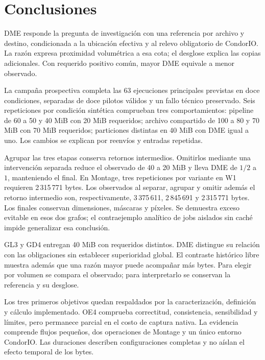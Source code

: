 \chapter{Conclusiones}
DME responde la pregunta de investigación con una referencia por archivo y destino, condicionada a la ubicación efectiva y al relevo obligatorio de CondorIO. La razón expresa proximidad volumétrica a esa cota; el desglose explica las copias adicionales. Con requerido positivo común, mayor DME equivale a menor observado.

La campaña prospectiva completa las 63 ejecuciones principales previstas en doce condiciones, separadas de doce pilotos válidos y un fallo técnico preservado. Seis repeticiones por condición sintética comprueban tres comportamientos: pipeline de 60 a 50 y 40 MiB con 20 MiB requeridos; archivo compartido de 100 a 80 y 70 MiB con 70 MiB requeridos; particiones distintas en 40 MiB con DME igual a uno. Los cambios se explican por reenvíos y entradas repetidas.

Agrupar las tres etapas conserva retornos intermedios. Omitirlos mediante una intervención separada reduce el observado de 40 a 20 MiB y lleva DME de $1/2$ a $1$, manteniendo el final. En Montage, tres repeticiones por variante en W1 requieren 2\,315\,771 bytes. Los observados al separar, agrupar y omitir además el retorno intermedio son, respectivamente, 3\,375\,611, 2\,845\,691 y 2\,315\,771 bytes. Los finales conservan dimensiones, máscaras y píxeles. Se demuestra exceso evitable en esos dos grafos; el contraejemplo analítico de jobs aislados sin caché impide generalizar esa conclusión.

GL3 y GD4 entregan 40 MiB con requeridos distintos. DME distingue su relación con las obligaciones sin establecer superioridad global. El contraste histórico libre muestra además que una razón mayor puede acompañar más bytes. Para elegir por volumen se compara el observado; para interpretarlo se conservan la referencia y su desglose.

Los tres primeros objetivos quedan respaldados por la caracterización, definición y cálculo implementado. OE4 comprueba correctitud, consistencia, sensibilidad y límites, pero permanece parcial en el costo de captura nativa. La evidencia comprende flujos pequeños, dos operaciones de Montage y un único entorno CondorIO. Las duraciones describen configuraciones completas y no aíslan el efecto temporal de los bytes.
